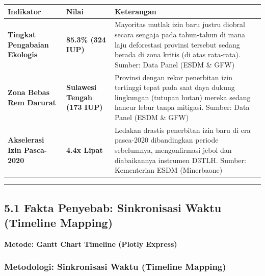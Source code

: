 \documentclass[
]{article}
\newcounter{none} %
\begin{document}
{\def\LTcaptype{none} %
\begin{longtable}[]{@{}
  >{\raggedright\arraybackslash}p{}
  >{\raggedright\arraybackslash}p{}
  >{\raggedright\arraybackslash}p{}@{}}
\toprule\noalign{}
\begin{minipage}[b]{\linewidth}\raggedright
Indikator
\end{minipage} & \begin{minipage}[b]{\linewidth}\raggedright
Nilai
\end{minipage} & \begin{minipage}[b]{\linewidth}\raggedright
Keterangan
\end{minipage} \\
\midrule\noalign{}
\endhead
\bottomrule\noalign{}
\endlastfoot
\textbf{Tingkat Pengabaian Ekologis} & \textbf{85.3\% (324 IUP)} &
Mayoritas mutlak izin baru justru diobral secara sengaja pada
tahun-tahun di mana laju deforestasi provinsi tersebut sedang berada di
zona kritis (di atas rata-rata). Sumber: Data Panel (ESDM \& GFW) \\
\textbf{Zona Bebas Rem Darurat} & \textbf{Sulawesi Tengah (173 IUP)} &
Provinsi dengan rekor penerbitan izin tertinggi tepat pada saat daya
dukung lingkungan (tutupan hutan) mereka sedang hancur lebur tanpa
mitigasi. Sumber: Data Panel (ESDM \& GFW) \\
\textbf{Akselerasi Izin Pasca-2020} & \textbf{4.4x Lipat} & Ledakan
drastis penerbitan izin baru di era pasca-2020 dibandingkan periode
sebelumnya, mengonfirmasi jebol dan diabaikannya instrumen D3TLH.
Sumber: Kementerian ESDM (Minerbaone) \\
\end{longtable}
}

\begin{center}\rule{0.5\linewidth}{0.5pt}\end{center}

\subsection{5.1 Fakta Penyebab: Sinkronisasi Waktu (Timeline
Mapping)}\label{fakta-penyebab-sinkronisasi-waktu-timeline-mapping}

\textbf{Metode: Gantt Chart Timeline (Plotly Express)}

\subsubsection{Metodologi: Sinkronisasi Waktu (Timeline
Mapping)}\label{metodologi-sinkronisasi-waktu-timeline-mapping}
\end{document}
